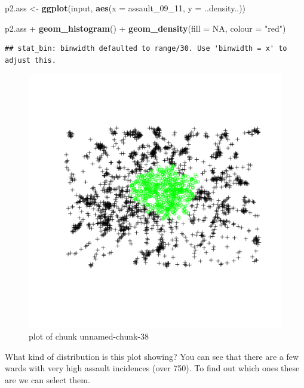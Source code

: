 \documentclass[]{article}
\makeatletter
\newenvironment{Shaded}{}{}
\newcommand{\KeywordTok}[1]{\textcolor[rgb]{0.00,0.44,0.13}{\textbf{{#1}}}}
\newcommand{\DataTypeTok}[1]{\textcolor[rgb]{0.56,0.13,0.00}{{#1}}}
\newcommand{\StringTok}[1]{\textcolor[rgb]{0.25,0.44,0.63}{{#1}}}
\newcommand{\OtherTok}[1]{\textcolor[rgb]{0.00,0.44,0.13}{{#1}}}
\newcommand{\NormalTok}[1]{{#1}}
\def\maxwidth{\ifdim\Gin@nat@width>\linewidth\linewidth
\else\Gin@nat@width\fi}
\let\Oldincludegraphics\includegraphics
\renewcommand{\includegraphics}[1]{\Oldincludegraphics[width=\maxwidth]{#1}}
\makeatother
\begin{document}
\begin{Shaded}
\begin{Highlighting}[]
\NormalTok{p2.ass <- }\KeywordTok{ggplot}\NormalTok{(input, }\KeywordTok{aes}\NormalTok{(}\DataTypeTok{x =} \NormalTok{assault_09_11, }\DataTypeTok{y =} \NormalTok{..density..))}

\NormalTok{p2.ass + }\KeywordTok{geom_histogram}\NormalTok{() + }\KeywordTok{geom_density}\NormalTok{(}\DataTypeTok{fill =} \OtherTok{NA}\NormalTok{, }\DataTypeTok{colour =} \StringTok{"red"}\NormalTok{)}
\end{Highlighting}
\end{Shaded}
\begin{verbatim}
## stat_bin: binwidth defaulted to range/30. Use 'binwidth = x' to adjust this.
\end{verbatim}
\begin{figure}[htbp]
\centering
\includegraphics{figure/unnamed-chunk-38.png}
\caption{plot of chunk unnamed-chunk-38}
\end{figure}

What kind of distribution is this plot showing? You can see that there
are a few wards with very high assault incidences (over 750). To find
out which ones these are we can select them.
\end{document}
